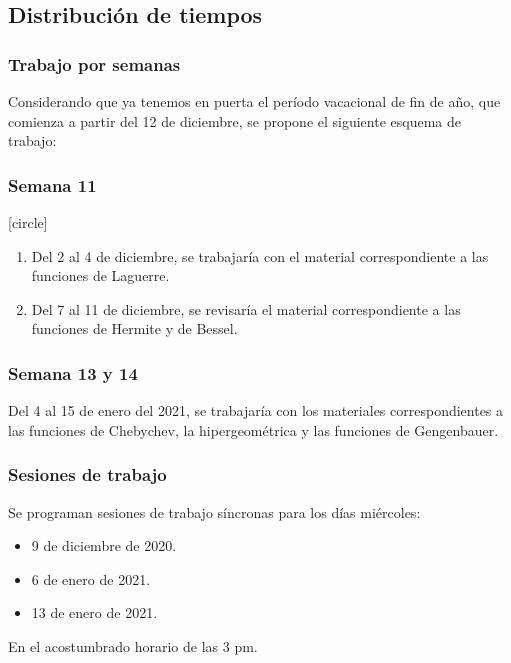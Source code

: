 \subsection{Distribución de tiempos}
\begin{frame}
\frametitle{Trabajo por semanas}
Considerando que ya tenemos en puerta el período vacacional de fin de año, que comienza a partir del 12 de diciembre, se propone el siguiente esquema de trabajo:
\end{frame}
\begin{frame}
\frametitle{Semana 11}
[circle]
\begin{enumerate}[<+->]
\item Del 2 al 4 de diciembre, se trabajaría con el material correspondiente a las funciones de Laguerre.
\item Del 7 al 11 de diciembre, se revisaría el material correspondiente a las funciones de Hermite y de Bessel.
\end{enumerate}
\end{frame}
\begin{frame}
\frametitle{Semana 13 y 14}
Del 4 al 15 de enero del 2021, se trabajaría con los materiales correspondientes a las funciones de Chebychev, la hipergeométrica y las funciones de Gengenbauer.
\end{frame}
\begin{frame}
\frametitle{Sesiones de trabajo}
Se programan sesiones de trabajo síncronas para los días miércoles:
\begin{itemize}
\item 9 de diciembre de 2020.
\item 6 de enero de 2021.
\item 13 de enero de 2021.
\end{itemize}
En el acostumbrado horario de las 3 pm.
\end{frame} 

